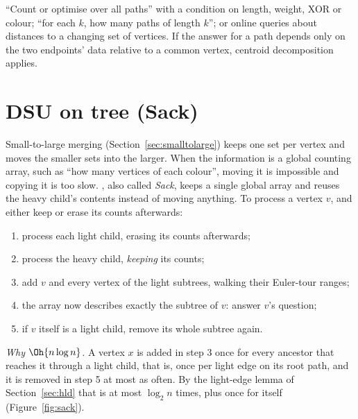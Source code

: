 
\begin{recognize}
``Count or optimise over all paths'' with a condition on length, weight, XOR or colour; ``for each $k$, how many paths of length
$k$''; or online queries about distances to a changing set of vertices. If the answer for a path depends only on the two
endpoints' data relative to a common vertex, centroid decomposition applies.
\end{recognize}

\section[DSU on tree]{DSU on tree (Sack) \hfill \plat}\label{sec:sack}

Small-to-large merging (Section~\ref{sec:smalltolarge}) keeps one set per vertex and moves the smaller sets into the larger. When
the information is a global counting array, such as ``how many vertices of each colour'', moving it is impossible and copying it
is too slow. , also called \emph{Sack}, keeps a single global array and reuses the heavy child's contents instead
of moving anything. To process a vertex $v$, and either keep or erase its counts afterwards:
\begin{enumerate}[itemsep=1pt]
  \item process each light child, erasing its counts afterwards;
  \item process the heavy child, \emph{keeping} its counts;
  \item add $v$ and every vertex of the light subtrees, walking their Euler-tour ranges;
  \item the array now describes exactly the subtree of $v$: answer $v$'s question;
  \item if $v$ itself is a light child, remove its whole subtree again.
\end{enumerate}

\emph{Why $\Oh{n \log n}$.} A vertex $x$ is added in step 3 once for every ancestor that reaches it through a light child, that
is, once per light edge on its root path, and it is removed in step 5 at most as often. By the light-edge lemma of
Section~\ref{sec:hld} that is at most $\log_2 n$ times, plus once for itself (Figure~\ref{fig:sack}).

